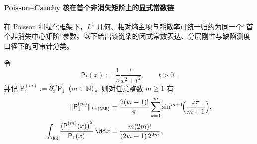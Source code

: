 \paragraph{Poisson--Cauchy 核在首个非消失矩阶上的显式常数链}
在 Poisson 粗粒化框架下，\(L^1\) 几何、相对熵主项与耗散率可统一归约为同一个“首个非消失中心矩阶”参数。以下给出该链条的闭式常数表达、分层刚性与缺陷测度口径下的可审计分类。

\begin{theorem}\label{thm:xi-poisson-kernel-derivative-l1-fisher-closed}
令
\[
\mathsf P_t(x):=\frac1\pi\frac{t}{x^2+t^2},\qquad t>0,
\]
并记 \(\mathsf P_1^{(m)}:=\partial_x^m\mathsf P_1\)（\(m\in\mathbb N\)）。则对任意整数 \(m\ge 1\) 有
\begin{align}
\|\mathsf P_1^{(m)}\|_{L^1(\RR)}
&=\frac{2(m-1)!}{\pi}\sum_{k=1}^{m}\sin^{m+1}\!\Bigl(\frac{k\pi}{m+1}\Bigr),\label{eq:xi-poisson-kernel-derivative-l1-closed}\\
\int_{\RR}\frac{\bigl(\mathsf P_1^{(m)}(x)\bigr)^2}{\mathsf P_1(x)}\,\dd x
&=\frac{m(2m)!}{(2m-1)\,2^{2m}}.\label{eq:xi-poisson-kernel-derivative-fisher-closed}
\end{align}
\end{theorem}
